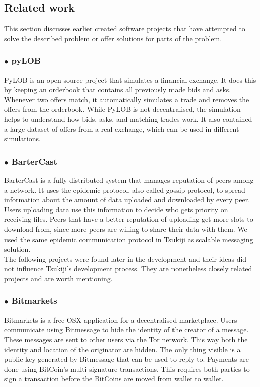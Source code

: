 \subsection{Related work}
This section discusses earlier created software projects that have attempted to solve the described problem or offer solutions for parts of the problem.

\subsubsection*{$\bullet$ pyLOB}
PyLOB \cite{pyLOB} is an open source project that simulates a financial exchange.
It does this by keeping an orderbook that contains all previously made bids and asks.
Whenever two offers match, it automatically simulates a trade and removes the offers from the orderbook.
While PyLOB is not decentralised, the simulation helps to understand how bids, asks, and matching trades work.
It also contained a large dataset of offers from a real exchange, which can be used in different simulations.

\subsubsection*{$\bullet$ BarterCast}
BarterCast \cite{bartercast} is a fully distributed system that manages reputation of peers among a network. 
It uses the epidemic protocol, also called gossip protocol, to spread information about the amount of data uploaded and downloaded by every peer.
Users uploading data use this information to decide who gets priority on receiving files.
Peers that have a better reputation of uploading get more slots to download from, since more peers are willing to share their data with them.
We used the same epidemic communication protocol in Tsukiji as scalable messaging solution.\\

The following projects were found later in the development and their ideas did not influence Tsukiji's development process.
They are nonetheless closely related projects and are worth mentioning.

\subsubsection*{$\bullet$ Bitmarkets}
Bitmarkets\cite{bitmarkets} is a free OSX application for a decentralised marketplace.
Users communicate using Bitmessage \cite{bitmessage} to hide the identity of the creator of a message.
These messages are sent to other users via the Tor \cite{tor} network.
This way both the identity and location of the originator are hidden.
The only thing visible is a public key generated by Bitmessage that can be used to reply to.
Payments are done using BitCoin's multi-signature transactions.
This requires both parties to sign a transaction before the BitCoins are moved from wallet to wallet.

